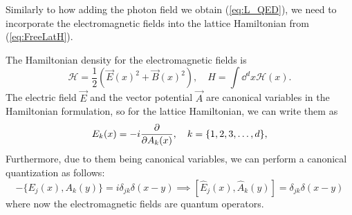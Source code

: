 \documentclass[a4paper]{report}
\begin{document}
\begin{spacing}{1.1}
Similarly to how adding the photon field we obtain (\ref{eq:L_QED}), we need to incorporate the electromagnetic fields into the lattice Hamiltonian from (\ref{eq:FreeLatH}). 

The Hamiltonian density for the electromagnetic fields is
\begin{equation}
    \mathscr{H} = \frac{1}{2} \left(\vec{E}(x)^2 + \vec{B}(x)^2\right), \quad H = \int \dd^d x \mathscr{H}(x). %
\end{equation}
The electric field $\vec{E}$ and the vector potential $\vec{A}$ are canonical variables in the Hamiltonian formulation, so for the lattice Hamiltonian, we can write them as
\begin{equation}
    {E}_k({x}) = -i \pdv{{A}_k({x})}, \quad k = \{1,2,3,\dots,d\},
\end{equation}
Furthermore, due to them being canonical variables, we can perform a canonical quantization as follows:
\begin{equation}
    -\{ E_j({x}), A_k({y}) \} = i\delta_{jk} \delta({x}-{y}) \implies \left[ \hat{E}_j({x}), \hat{A}_k({y})\right] = \delta_{jk} \delta({x}-{y})
\end{equation}
where now the electromagnetic fields are quantum operators.


\end{spacing}
\end{document}
